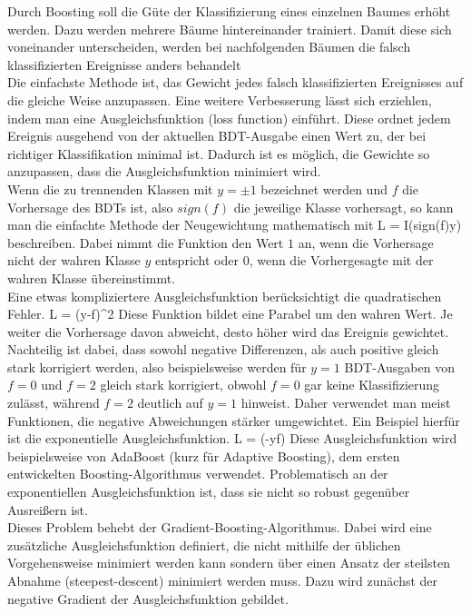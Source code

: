 Durch Boosting soll die G\"ute der Klassifizierung eines einzelnen Baumes erh\"oht werden. Dazu werden mehrere B\"aume hintereinander trainiert. Damit diese sich voneinander unterscheiden, werden bei nachfolgenden B\"aumen die falsch klassifizierten Ereignisse anders behandelt\\
Die einfachste Methode ist, das Gewicht jedes falsch klassifizierten Ereignisses auf die gleiche Weise anzupassen. Eine weitere Verbesserung l\"asst sich erziehlen, indem man eine Ausgleichsfunktion (loss function) einf\"uhrt. Diese ordnet jedem Ereignis ausgehend von der aktuellen BDT-Ausgabe einen Wert zu, der bei richtiger Klassifikation minimal ist. Dadurch ist es m\"oglich, die Gewichte so anzupassen, dass die Ausgleichsfunktion minimiert wird.\\
Wenn die zu trennenden Klassen mit $y=\pm1$ bezeichnet werden und $f$ die Vorhersage des BDTs ist, also $sign(f)$ die jeweilige Klasse vorhersagt, so kann man die einfachte Methode der Neugewichtung mathematisch mit
\beq
L = I(sign(f)\neq y)
\label{eq:missclass_loss}
\eeq
beschreiben. Dabei nimmt die Funktion den Wert $1$ an, wenn die Vorhersage nicht der wahren Klasse $y$ entspricht oder $0$, wenn die Vorhergesagte mit der wahren Klasse \"ubereinstimmt.\\
Eine etwas kompliziertere Ausgleichsfunktion ber\"ucksichtigt die quadratischen Fehler.
\beq
L = (y-f)^2
\label{eq:squarederror_loss}
\eeq
Diese Funktion bildet eine Parabel um den wahren Wert. Je weiter die Vorhersage davon abweicht, desto h\"oher wird das Ereignis gewichtet. Nachteilig ist dabei, dass sowohl negative Differenzen, als auch positive gleich stark korrigiert werden, also beispielsweise werden f\"ur $y=1$ BDT-Ausgaben von $f=0$ und $f=2$ gleich stark korrigiert, obwohl $f=0$ gar keine Klassifizierung zul\"asst, w\"ahrend $f=2$ deutlich auf $y=1$ hinweist. Daher verwendet man meist Funktionen, die negative Abweichungen st\"arker umgewichtet. Ein Beispiel hierf\"ur ist die exponentielle Ausgleichsfunktion.
\beq
L = \exp(-y\cdot f)
\label{eq:exp_loss}
\eeq
Diese Ausgleichsfunktion wird beispielsweise von AdaBoost (kurz f\"ur Adaptive Boosting), dem ersten entwickelten Boosting-Algorithmus verwendet. Problematisch an der exponentiellen Ausgleichsfunktion ist, dass sie nicht so robust gegen\"uber Ausrei\ss ern ist.\\
Dieses Problem behebt der Gradient-Boosting-Algorithmus. Dabei wird eine zus\"atzliche Ausgleichsfunktion definiert, die nicht mithilfe der \"ublichen Vorgehensweise minimiert werden kann sondern \"uber einen Ansatz der steilsten Abnahme (steepest-descent) minimiert werden muss. Dazu wird zun\"achst der negative Gradient der Ausgleichsfunktion gebildet.
